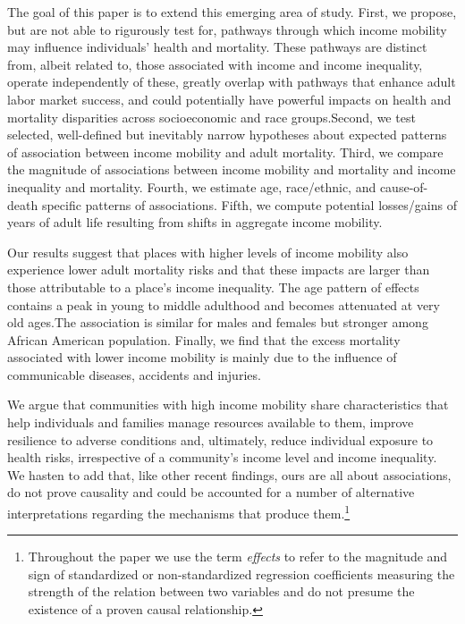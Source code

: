\documentclass[11pt]{article}
\begin{document}
The goal of this paper is to extend this emerging area of study. First, we propose, but are not able to rigurously test for, pathways through which income mobility may influence individuals' health and mortality. These pathways are distinct from, albeit related to, those associated with income and income inequality, operate independently of these, greatly overlap with pathways that enhance adult labor market success, and could potentially have powerful impacts on health and mortality disparities across socioeconomic and race groups.Second, we test selected, well-defined but inevitably narrow hypotheses about expected patterns of association between income mobility and adult mortality. Third, we compare the magnitude of associations between income mobility and mortality and income inequality and mortality. Fourth, we estimate age, race/ethnic, and cause-of-death specific patterns of associations. Fifth, we compute potential losses/gains of years of adult life resulting from shifts in aggregate income mobility. 

Our results suggest that places with higher levels of income mobility also experience lower adult mortality risks and that these impacts are larger than those attributable to a place's income inequality. The age pattern of effects contains a peak in young to middle adulthood and becomes attenuated at very old ages.The association is similar for males and females but stronger among African American population. Finally, we find that the excess mortality associated with lower income mobility is mainly due to the influence of communicable diseases, accidents and injuries.

We argue that communities with high income mobility share characteristics that help individuals and families manage resources available to them, improve resilience to adverse conditions and, ultimately, reduce individual exposure to health risks, irrespective of a community's income level and income inequality. We hasten to add that, like other recent findings, ours are all about associations, do not prove causality and could be accounted for a number of alternative interpretations regarding the mechanisms that produce them.\footnote{Throughout the paper we use the term \textit{effects} to refer to the magnitude and sign of standardized or non-standardized regression coefficients measuring the strength of the relation between two variables and do not presume the existence of a proven causal relationship.}
\end{document}
